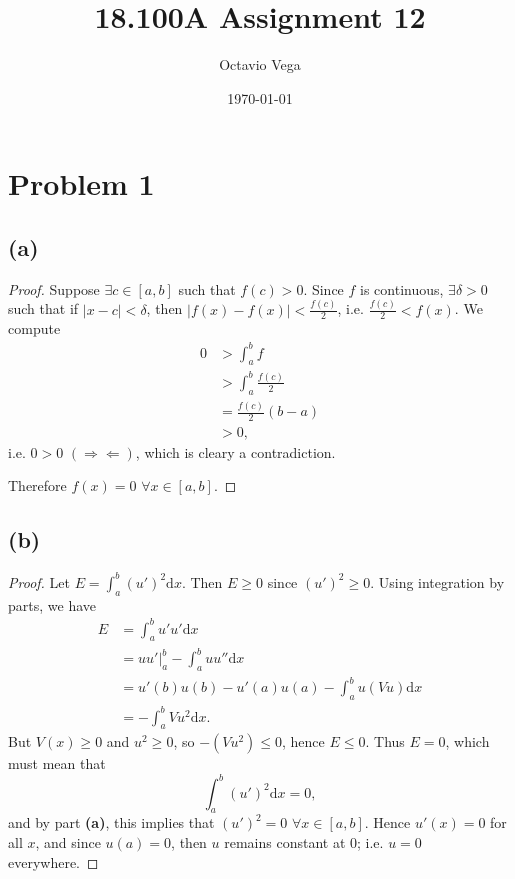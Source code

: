 \documentclass{article}
\title{18.100A Assignment 12}
\author{Octavio Vega}
\date\today
\begin{document}
\maketitle
	
\section*{Problem 1}
\subsection*{(a)}
\begin{proof}
	Suppose $\exists c \in [a, b]$ such that $f(c) > 0$. Since $f$ is continuous, $\exists \delta > 0$ such that if $|x - c| < \delta$, then $|f(x) - f(x)| < \frac{f(c)}{2}$, i.e. $\frac{f(c)}{2} < f(x)$. We compute
	\begin{align}
		0 &> \int_a^b f \\
		&> \int_a ^b \frac{f(c)}{2} \\
		&= \frac{f(c)}{2}(b - a) \\
		&> 0,
	\end{align}
	i.e. $0 > 0$ $(\Rightarrow \Leftarrow)$, which is cleary a contradiction.
	
	Therefore $f(x) = 0$ $\forall x \in [a, b]$.  
\end{proof}

\subsection*{(b)}
\begin{proof}
	Let $E = \int_a ^b (u')^2 \mathrm{d}x$. Then $E \geq 0$ since $(u')^2 \geq 0$. Using integration by parts, we have
	\begin{align}
		E &= \int_a ^b u' u' \mathrm{d}x \\
		&= u u' \big |_a ^b - \int_a ^b u u'' \mathrm{d}x \\
		&= u'(b) u(b) - u'(a) u(a) - \int_a ^b u (V u) \mathrm{d}x \\
		&= - \int_a ^b V u^2 \mathrm{d}x.
	\end{align}
	But $V(x) \geq 0$ and $u^2 \geq 0$, so $-(Vu^2) \leq 0$, hence $E \leq 0$. Thus $E = 0$, which must mean that 
	\begin{equation}
		\int_a ^b (u')^2 \mathrm{d}x = 0,
	\end{equation}
	and by part \textbf{(a)}, this implies that $(u')^2 = 0$  $\forall x \in [a, b]$. Hence $u'(x) = 0$ for all $x$, and since $u(a) = 0$, then $u$ remains constant at $0$; i.e. $u = 0$ everywhere.
\end{proof}
\end{document}
